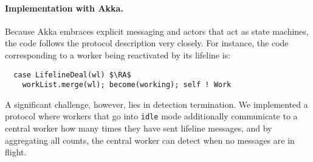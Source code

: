 
\paragraph{Implementation with Akka.} Because Akka embraces explicit messaging
and actors that act as state machines, the code follows the protocol
description very closely. For instance, the code corresponding to a worker
being reactivated by its lifeline is:
\begin{lstlisting}
  case LifelineDeal(wl) $\RA$
    workList.merge(wl); become(working); self ! Work
\end{lstlisting}
A significant challenge, however, lies in detection termination. We implemented
a protocol where workers that go into \lstinline{idle} mode additionally
communicate to a central worker how many times they have sent lifeline
messages, and by aggregating all counts, the central worker can detect when no
messages are in flight.

% 
% 
% 
% 
% 



